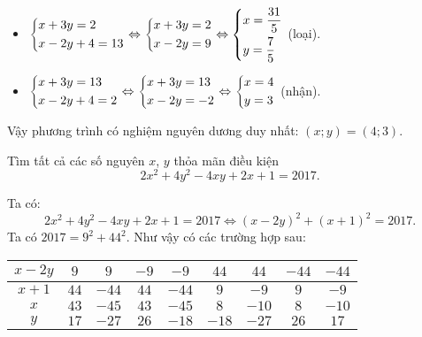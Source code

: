 \begin{bt}
{\begin{enumerate}
\begin{itemize}
			\item $\left\{\begin{aligned}&x+3y=2\\&x-2y+4=13\end{aligned}\right.\Leftrightarrow \left\{\begin{aligned}&x+3y=2\\&x-2y=9\end{aligned}\right.\Leftrightarrow \left\{\begin{aligned}&x=\dfrac{31}{5}\\&y=\dfrac{7}{5}\end{aligned}\right.$ (loại).
			\item $\left\{\begin{aligned}&x+3y=13\\&x-2y+4=2\end{aligned}\right.\Leftrightarrow \left\{\begin{aligned}&x+3y=13\\&x-2y=-2\end{aligned}\right.\Leftrightarrow \left\{\begin{aligned}&x=4\\&y=3\end{aligned}\right.$ (nhận).
		\end{itemize}
		Vậy phương trình có nghiệm nguyên dương duy nhất: $(x;y)=(4;3)$.
	\end{enumerate}
}
\end{bt}

\begin{bt}%
\hfill

Tìm tất cả các số nguyên $x$, $y$ thỏa mãn điều kiện 
\[2{x}^{2}+4{y}^{2}-4xy+2x+1=2017.\]
\loigiai
{
	
	Ta có:
	\[2x^{2}+4{y}^{2}-4xy+2x+1=2017\Leftrightarrow {\left( x-2y \right)}^{2}+{(x+1)}^{2}=2017.\]
	Ta có $2017={{9}^{2}}+{{44}^{2}}$.
	Như vậy có các trường hợp sau:
	\begin{center}
		\begin{tabular}{|l|l|l|l|l|l|l|l|l|}
			\hline
			\multicolumn{1}{|c|}{$x-2y$} & \multicolumn{1}{c|}{$9$} & \multicolumn{1}{c|}{$9$} & \multicolumn{1}{c|}{$-9$} & \multicolumn{1}{c|}{$-9$} & \multicolumn{1}{c|}{$44$} & \multicolumn{1}{c|}{$44$} & \multicolumn{1}{c|}{$-44$} & \multicolumn{1}{c|}{$-44$} \\ 
			\hline
			\multicolumn{1}{|c|}{$x+1$} & \multicolumn{1}{c|}{$44$} & \multicolumn{1}{c|}{$-44$} & \multicolumn{1}{c|}{$44$} & \multicolumn{1}{c|}{$-44$} & \multicolumn{1}{c|}{$9$} & \multicolumn{1}{c|}{$-9$} & \multicolumn{1}{c|}{$9$} & \multicolumn{1}{c|}{$-9$} \\ 
			\hline
			\multicolumn{1}{|c|}{$x$} & \multicolumn{1}{c|}{$43$} & \multicolumn{1}{c|}{$-45$} & \multicolumn{1}{c|}{$43$} & \multicolumn{1}{c|}{$-45$} & \multicolumn{1}{c|}{$8$} & \multicolumn{1}{c|}{$-10$} & \multicolumn{1}{c|}{$8$} & \multicolumn{1}{c|}{$-10$} \\ 
			\hline
			\multicolumn{1}{|c|}{$y$} & \multicolumn{1}{c|}{$17$} & \multicolumn{1}{c|}{$-27$} & \multicolumn{1}{c|}{$26$} & \multicolumn{1}{c|}{$-18$} & \multicolumn{1}{c|}{$-18$} & \multicolumn{1}{c|}{$-27$} & \multicolumn{1}{c|}{$26$} & \multicolumn{1}{c|}{$17$} \\ 
			\hline
		\end{tabular}
	\end{center}    
}
\end{bt}

